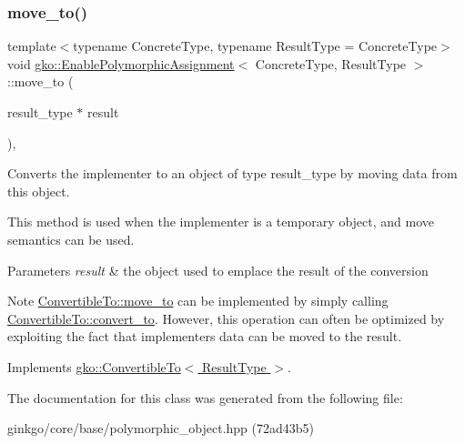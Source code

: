 \subsubsection{\texorpdfstring{move\+\_\+to()}{move\_to()}}
{\footnotesize\ttfamily template$<$typename Concrete\+Type, typename Result\+Type = Concrete\+Type$>$ \\
void \hyperlink{classgko_1_1EnablePolymorphicAssignment}{gko\+::\+Enable\+Polymorphic\+Assignment}$<$ Concrete\+Type, Result\+Type $>$\+::move\+\_\+to (\begin{DoxyParamCaption}\item[{result\+\_\+type $\ast$}]{result }\end{DoxyParamCaption})\hspace{0.3cm}{\ttfamily [override]}, {\ttfamily [virtual]}}



Converts the implementer to an object of type result\+\_\+type by moving data from this object. 

This method is used when the implementer is a temporary object, and move semantics can be used.


\begin{DoxyParams}{Parameters}
{\em result} & the object used to emplace the result of the conversion\\
\hline
\end{DoxyParams}
\begin{DoxyNote}{Note}
\hyperlink{classgko_1_1ConvertibleTo_ab9047c7c49e0f83c79b54c0034d6197b}{Convertible\+To\+::move\+\_\+to} can be implemented by simply calling \hyperlink{classgko_1_1ConvertibleTo_aa7f3420babcbed39ee15bc020bed4f7e}{Convertible\+To\+::convert\+\_\+to}. However, this operation can often be optimized by exploiting the fact that implementer\textquotesingle{}s data can be moved to the result. 
\end{DoxyNote}


Implements \hyperlink{classgko_1_1ConvertibleTo_ab9047c7c49e0f83c79b54c0034d6197b}{gko\+::\+Convertible\+To$<$ Result\+Type $>$}.



The documentation for this class was generated from the following file\+:\begin{DoxyCompactItemize}
\item 
ginkgo/core/base/polymorphic\+\_\+object.\+hpp (72ad43b5)\end{DoxyCompactItemize}
